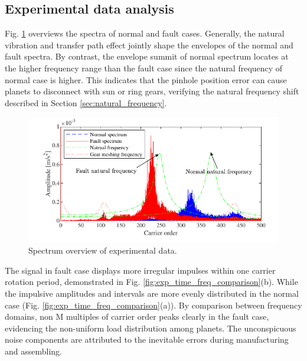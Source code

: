 \documentclass[a4paper,fleqn]{cas-sc}%
\begin{document}
\subsection{Experimental data analysis}
\par Fig. \ref{fig:exp_natural_frequency_shift} overviews the spectra of normal and fault cases. Generally, the natural vibration and transfer path effect jointly shape the envelopes of the normal and fault spectra. By contrast, the envelope summit of normal spectrum locates at the higher frequency range than the fault case since the natural frequency of normal case is higher. This indicates that the pinhole position error can cause planets to disconnect with sun or ring gears, verifying the natural frequency shift described in Section \ref{sec:natural_frequency}.
\begin{figure}[pos=htbp]
    \centering
    \includegraphics{Exp_natural_frequency_shift.pdf}
    \caption{Spectrum overview of experimental data.}
    \label{fig:exp_natural_frequency_shift}
\end{figure}
\par The signal in fault case displays more irregular impulses within one carrier rotation period, demonstrated in Fig. \ref{fig:exp_time_freq_comparison}(b). While the impulsive amplitudes and intervals are more evenly distributed in the normal case (Fig. \ref{fig:exp_time_freq_comparison}(a)). By comparison between frequency domains, non M multiples of carrier order peaks clearly in the fault case, evidencing the non-uniform load distribution among planets. The unconspicuous noise components are attributed to the inevitable errors during manufacturing and assembling.
\end{document}
